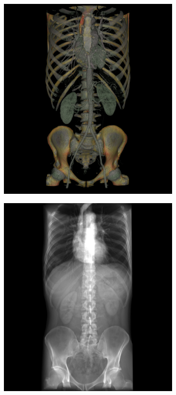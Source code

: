 \begin{figure}
\centering
\begin{subfigure}{.6\columnwidth}
    \includegraphics[width=\columnwidth]{TorsoBlendingComposite.png}
\end{subfigure}
\begin{subfigure}{.6\columnwidth}   
    \includegraphics[width=\columnwidth]{TorsoBlendingAdditive.png}

\end{subfigure}
\end{figure}

